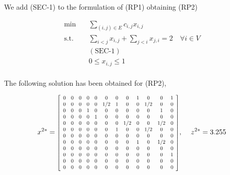 \documentclass[12pt]{article}
\begin{document}
We add (SEC-1) to the formulation of (RP1) obtaining (RP2)

\begin{equation}
    \begin{aligned}
        \min \quad & \sum_{(i,j)\in E}c_{i,j}x_{i,j}\\
        \textrm{s.t.} \quad & \sum_{i<j}x_{i,j} + \sum_{j<i}x_{j,i} = 2 \quad \forall i \in V\\
        & (\text{SEC-1})   \\
        & 0 \leq x_{i,j}\leq 1    \\
    \end{aligned}
    \tag{RP2}\label{opt-P2}
\end{equation}

The following solution has been obtained for (RP2),

\begin{equation}
    x^{2*} = 
\resizebox{0.5\linewidth}{!}{$
        \left[ \begin {array}{cccccccccccc} 
        
         0& 0& 0& 0& 0& 0& 0&  0& 1& 0& 0& 1\\
         0&0&0&0&0&1/2&1&0&0&1/2&0&0\\
         0&0&0&1&0&0&0&0&0&0&1&0\\
         0&0&0&0&1&0&0&0&0&0&0&0\\
         0&0&0&0&0&0&0&1/2&0&0&1/2&0\\
         0&0&0&0&0&0&1&0&0&1/2&0&0\\
         0&0&0&0&0&0&0&0&0&0&0&0\\
         0&0&0&0&0&0&0&0&1&0&1/2&0\\
         0&0&0&0&0&0&0&0&0&0&0&0\\
         0&0&0&0&0&0&0&0&0&0&0&1\\
         0&0&0&0&0&0&0&0&0&0&0&0\\
         0&0&0&0&0&0&0&0&0&0&0&0\\
        \end {array}
        \right]     
$}
\text{, } \quad z^{2*} = 3.255
\end{equation}
\end{document}
